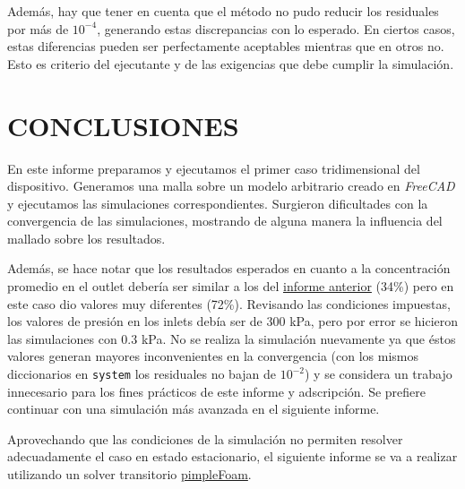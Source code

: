 \documentclass[oneside,a4paper,spanish,links]{amca}
\begin{document}
Además, hay que tener en cuenta que el método no pudo reducir los residuales por más de $10^{-4}$, generando estas discrepancias con lo esperado. En ciertos casos, estas diferencias pueden ser perfectamente aceptables mientras que en otros no. Esto es criterio del ejecutante y de las exigencias que debe cumplir la simulación.

\section{CONCLUSIONES}
En este informe preparamos y ejecutamos el primer caso tridimensional del dispositivo. Generamos una malla sobre un modelo arbitrario creado en \textit{FreeCAD} y ejecutamos las simulaciones correspondientes. Surgieron dificultades con la convergencia de las simulaciones, mostrando de alguna manera la influencia del mallado sobre los resultados.

Además, se hace notar que los resultados esperados en cuanto a la concentración promedio en el outlet debería ser similar a los del \href{https://github.com/guillerolle/informes_cfd/blob/master/Informe02.pdf}{informe anterior} (34\%) pero en este caso dio valores muy diferentes (72\%). Revisando las condiciones impuestas, los valores de presión en los inlets debía ser de 300 kPa, pero por error se hicieron las simulaciones con 0.3 kPa. No se realiza la simulación nuevamente ya que éstos valores generan mayores inconvenientes en la convergencia (con los mismos diccionarios en \texttt{system} los residuales no bajan de $10^{-2}$) y se considera un trabajo innecesario para los fines prácticos de este informe y adscripción. Se prefiere continuar con una simulación más avanzada en el siguiente informe.

Aprovechando que las condiciones de la simulación no permiten resolver adecuadamente el caso en estado estacionario, el siguiente informe se va a realizar utilizando un solver transitorio \href{https://www.openfoam.com/documentation/guides/latest/doc/guide-applications-solvers-incompressible-pimpleFoam.html}{pimpleFoam}.

%
%
\end{document}
